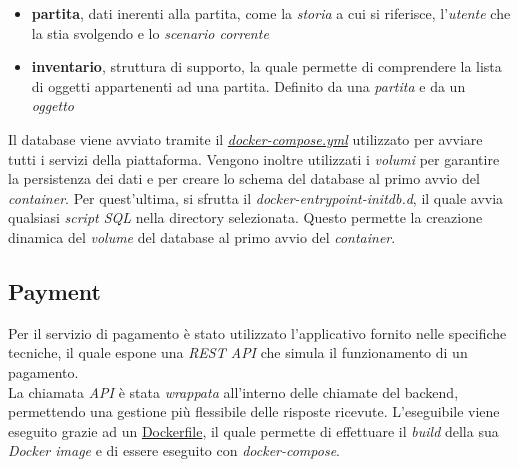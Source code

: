 \documentclass{article}
\begin{document}
\begin{itemize}[label = {-}]
    \item \textbf{partita}, dati inerenti alla partita, come la \textit{storia} a cui si riferisce, l'\textit{utente} che la stia svolgendo e lo \textit{scenario corrente}
    \item \textbf{inventario}, struttura di supporto, la quale permette di comprendere la lista di oggetti appartenenti ad una partita. Definito da una \textit{partita} e da un \textit{oggetto}
\end{itemize}
Il database viene avviato tramite il \href{https://github.com/DavideDeRosa/storJ_SWE/blob/develop/docker-compose.yml}{\textit{docker-compose.yml}} utilizzato per avviare tutti i servizi della piattaforma. Vengono inoltre utilizzati i \textit{volumi} per garantire la persistenza dei dati e per creare lo schema del database al primo avvio del \textit{container}. Per quest'ultima, si sfrutta il \textit{docker-entrypoint-initdb.d}, il quale avvia qualsiasi \textit{script SQL} nella directory selezionata. Questo permette la creazione dinamica del \textit{volume} del database al primo avvio del \textit{container}. 

\subsection*{Payment}
Per il servizio di pagamento è stato utilizzato l'applicativo fornito nelle specifiche tecniche, il quale espone una \textit{REST API} che simula il funzionamento di un pagamento.\\
La chiamata \textit{API} è stata \textit{wrappata} all'interno delle chiamate del backend, permettendo una gestione più flessibile delle risposte ricevute. L’eseguibile viene eseguito grazie ad un \href{https://github.com/DavideDeRosa/storJ_SWE/blob/develop/payment/Dockerfile}{Dockerfile}, il quale permette di effettuare il \textit{build} della sua \textit{Docker image} e di essere eseguito con \textit{docker-compose}.
\end{document}
